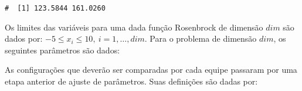 \documentclass[11pt,twoside,printwatermark=false]{pinp}
\begin{document}
\begin{ShadedResult}
\begin{verbatim}
#  [1] 123.5844 161.0260
\end{verbatim}
\end{ShadedResult}

Os limites das variáveis para uma dada função Rosenbrock de dimensão
\(dim\) são dados por: \(-5\leq x_i\leq 10,~i=1,\dotsc,dim\). Para o
problema de dimensão \(dim\), os seguintes parâmetros são dados:

\begin{Shaded}
\begin{Highlighting}[]
\StringTok{ }

\StringTok{ }\NormalTok{(} \NormalTok{)}
\StringTok{ }\NormalTok{(} \NormalTok{, }  \OperatorTok{*}\StringTok{ }  \OperatorTok{*}\StringTok{ }
\StringTok{ }\NormalTok{(} \NormalTok{, } \NormalTok{(}\OperatorTok{-} \NormalTok{(}
\StringTok{ } \OperatorTok{*}\StringTok{ }
\end{Highlighting}
\end{Shaded}

As configurações que deverão ser comparadas por cada equipe passaram por
uma etapa anterior de ajuste de parâmetros. Suas definições são dadas
por:

\begin{Shaded}
\begin{Highlighting}[]

\StringTok{ }\NormalTok{(} \NormalTok{) }
\StringTok{ }\NormalTok{(} \NormalTok{, } \NormalTok{)}

\StringTok{ }\NormalTok{(} \NormalTok{, } \NormalTok{) }
\StringTok{ }\NormalTok{(} \NormalTok{, } \NormalTok{)}
\end{Highlighting}
\end{Shaded}
\end{document}
